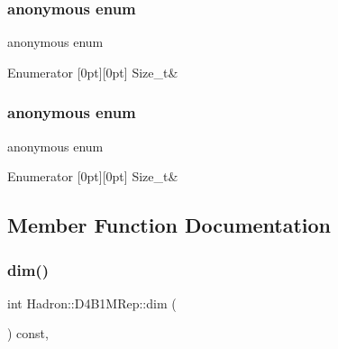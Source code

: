 \subsubsection{\texorpdfstring{anonymous enum}{anonymous enum}}
{\footnotesize\ttfamily anonymous enum}

\begin{DoxyEnumFields}{Enumerator}
[0pt][0pt]{}\mbox{\label{structHadron_1_1D4B1MRep_aa2c509a7d5a798068159856ef0989025acd3afdc9da25e652764e19d3f96dfb4e}} 
Size\+\_\+t&\\
\hline

\end{DoxyEnumFields}
\mbox{\label{structHadron_1_1D4B1MRep_aa2c509a7d5a798068159856ef0989025}} 
\subsubsection{\texorpdfstring{anonymous enum}{anonymous enum}}
{\footnotesize\ttfamily anonymous enum}

\begin{DoxyEnumFields}{Enumerator}
[0pt][0pt]{}\mbox{\label{structHadron_1_1D4B1MRep_aa2c509a7d5a798068159856ef0989025acd3afdc9da25e652764e19d3f96dfb4e}} 
Size\+\_\+t&\\
\hline

\end{DoxyEnumFields}


\subsection{Member Function Documentation}
\mbox{\label{structHadron_1_1D4B1MRep_a157803c0c4f71990cbc71bd4f37f3254}} 
\subsubsection{\texorpdfstring{dim()}{dim()}\hspace{0.1cm}{\footnotesize\ttfamily [1/2]}}
{\footnotesize\ttfamily int Hadron\+::\+D4\+B1\+M\+Rep\+::dim (\begin{DoxyParamCaption}{ }\end{DoxyParamCaption}) const\hspace{0.3cm}{\ttfamily [inline]}, {\ttfamily [virtual]}}

